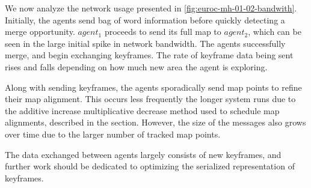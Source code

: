 We now analyze the network usage presented in \autoref{fig:euroc-mh-01-02-bandwith}. Initially, the agents send bag of word information before quickly detecting a merge opportunity. $agent_1$ proceeds to send its full map to $agent_2$, which can be seen in the large initial spike in network bandwidth. The agents successfully merge, and begin exchanging keyframes. The rate of keyframe data being sent rises and falls depending on how much new area the agent is exploring.

Along with sending keyframes, the agents sporadically send map points to refine their map alignment. This occurs less frequently the longer system runs due to the additive increase multiplicative decrease method used to schedule map alignments, described in the  section. However, the size of the messages also grows over time due to the larger number of tracked map points.

The data exchanged between agents largely consists of new keyframes, and further work should be dedicated to optimizing the serialized representation of keyframes.

